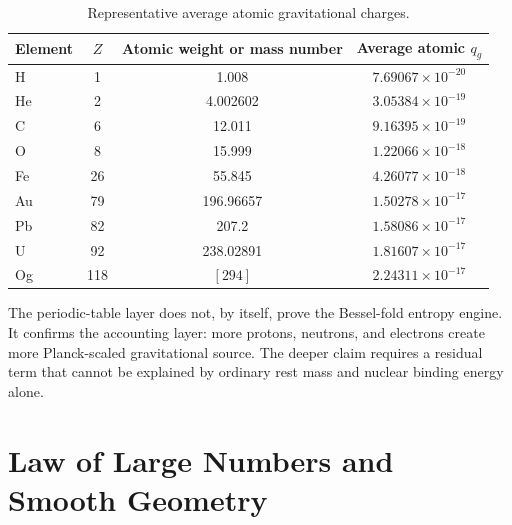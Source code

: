 \documentclass[11pt,a4paper]{article}
\begin{document}
\begin{table}[htbp]
\centering
\caption{Representative average atomic gravitational charges.}
\label{tab:atomic-charge}
\begin{tabular}{lccc}
\toprule
Element & $Z$ & Atomic weight or mass number & Average atomic $q_g$ \\
\midrule
H & 1 & 1.008 & $7.69067\times 10^{-20}$ \\
He & 2 & 4.002602 & $3.05384\times 10^{-19}$ \\
C & 6 & 12.011 & $9.16395\times 10^{-19}$ \\
O & 8 & 15.999 & $1.22066\times 10^{-18}$ \\
Fe & 26 & 55.845 & $4.26077\times 10^{-18}$ \\
Au & 79 & 196.96657 & $1.50278\times 10^{-17}$ \\
Pb & 82 & 207.2 & $1.58086\times 10^{-17}$ \\
U & 92 & 238.02891 & $1.81607\times 10^{-17}$ \\
Og & 118 & $[294]$ & $2.24311\times 10^{-17}$ \\
\bottomrule
\end{tabular}
\end{table}

The periodic-table layer does not, by itself, prove the Bessel-fold entropy engine. It confirms the accounting layer: more protons, neutrons, and electrons create more Planck-scaled gravitational source. The deeper claim requires a residual term that cannot be explained by ordinary rest mass and nuclear binding energy alone.

\section{Law of Large Numbers and Smooth Geometry}
\end{document}
